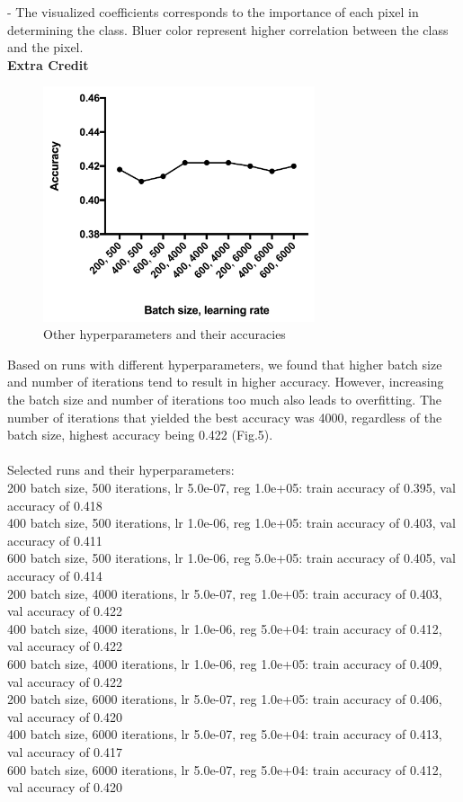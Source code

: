 \documentclass[12pt]{article}
\begin{document}
\noindent- The visualized coefficients corresponds to the importance of each pixel in determining the class. Bluer color represent higher correlation between the class and the pixel.\\

\pagebreak
\noindent \textbf{Extra Credit}
\begin{figure}[!tpb]
	\centerline{\includegraphics[width=80mm]{ExtraCredit.png}}
	\caption{\label{fig5}
		Other hyperparameters and their accuracies}
\end{figure}

\noindent Based on runs with different hyperparameters, we found that higher batch size and number of iterations tend to result in higher accuracy. However, increasing the batch size and number of iterations too much also leads to overfitting. The number of iterations that yielded the best accuracy was 4000, regardless of the batch size, highest accuracy being 0.422 (Fig.5).\\
\\
\noindent Selected runs and their hyperparameters:\\
200 batch size, 500 iterations, lr 5.0e-07, reg 1.0e+05: train accuracy of 0.395, val accuracy of 0.418\\
400 batch size, 500 iterations, lr 1.0e-06, reg 1.0e+05: train accuracy of 0.403, val accuracy of 0.411\\
600 batch size, 500 iterations, lr 1.0e-06, reg 5.0e+05: train accuracy of 0.405, val accuracy of 0.414\\
200 batch size, 4000 iterations, lr 5.0e-07, reg 1.0e+05: train accuracy of 0.403, val accuracy of 0.422\\
400 batch size, 4000 iterations, lr 1.0e-06, reg 5.0e+04: train accuracy of 0.412, val accuracy of 0.422\\
600 batch size, 4000 iterations, lr 1.0e-06, reg 1.0e+05: train accuracy of 0.409, val accuracy of 0.422\\
200 batch size, 6000 iterations, lr 5.0e-07, reg 1.0e+05: train accuracy of 0.406, val accuracy of 0.420\\
400 batch size, 6000 iterations, lr 5.0e-07, reg 5.0e+04: train accuracy of 0.413, val accuracy of 0.417\\
600 batch size, 6000 iterations, lr 5.0e-07, reg 5.0e+04: train accuracy of 0.412, val accuracy of 0.420\\
\end{document}
